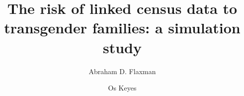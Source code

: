 \documentclass{jpc} %
\theoremstyle{plain}\newtheorem{satz}[thm]{Satz} %
\def\eg{{\em e.g.}}
\begin{document}
\title[Risk of linked census data to transgender families]{The risk of linked census data to transgender families: a simulation study}

\author[A.~Flaxman]{Abraham D. Flaxman}	%
\address{Institute for Health Metrics and Evaluation, University of Washington}	%

\author[O. Keyes]{Os Keyes}	%





\end{document}
